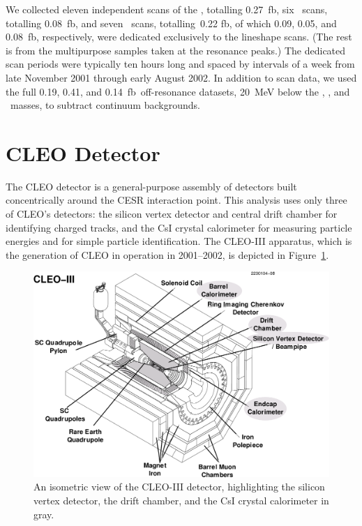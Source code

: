 \documentclass{cornell}
\begin{document}
We collected eleven independent scans of the \us, totalling
0.27~fb\inv, six \uss\ scans, totalling 0.08~fb\inv, and seven \usss\
scans, totalling~0.22 fb\inv, of which 0.09, 0.05, and 0.08~fb\inv,
respectively, were dedicated exclusively to the lineshape scans.  (The
rest is from the multipurpose samples taken at the resonance peaks.)
The dedicated scan periods were typically ten hours long and spaced by
intervals of a week from late November 2001 through early August 2002.
In addition to scan data, we used the full 0.19, 0.41, and
0.14~fb\inv\ off-resonance datasets, 20~MeV below the \us, \uss, and
\usss\ masses, to subtract continuum backgrounds.

\section{CLEO Detector}

The CLEO detector is a general-purpose assembly of detectors built
concentrically around the CESR interaction point.  This analysis uses
only three of CLEO's detectors: the silicon vertex detector and
central drift chamber for identifying charged tracks, and the CsI
crystal calorimeter for measuring particle energies and for simple
particle identification.  The CLEO-III apparatus, which is the
generation of CLEO in operation in 2001--2002, is depicted in
Figure~\ref{cleoiii}.

\begin{figure}[p]
  \begin{center}
    \includegraphics[height=0.8\linewidth, angle=90]{plots/cleoiii}
  \end{center}
  \caption{\label{cleoiii} An isometric view of the CLEO-III detector,
  highlighting the silicon vertex detector, the drift chamber, and the
  CsI crystal calorimeter in gray.}
\end{figure}
\end{document}
